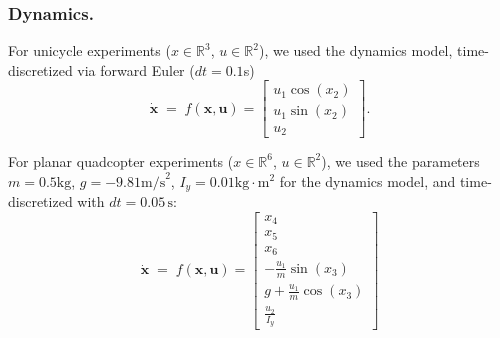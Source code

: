 \subsubsection{Dynamics. }\label{app:dynamics}
For unicycle experiments ($x \in \mathbb{R}^3$, $u \in \mathbb{R}^2$), we used the dynamics model, time-discretized via forward Euler ($dt =0.1$s)
\begin{equation}\label{eq:unicycle}
    \dot{\mathbf{x}}\;=\; f(\mathbf{x},\mathbf{u})=
    \begin{bmatrix}
        u_1 \cos(x_2) \\ u_1 \sin(x_2) \\ u_2
    \end{bmatrix}.
\end{equation}

\noindent For planar quadcopter experiments ($x \in \mathbb{R}^6$, $u \in \mathbb{R}^2$), we used the parameters $m=0.5\textrm{kg}$, $g=-9.81\textrm{m/s}^2$, $I_y=0.01\textrm{kg} \cdot \textrm{m}^2$ for the dynamics model, and time-discretized with $dt = 0.05\,\mathrm{s}$:%
\begin{equation}\label{eq:2dquad}
    \dot{\mathbf{x}}\;=\; f(\mathbf{x},\mathbf{u})=\begin{bmatrix}
        x_4 \\ x_5 \\ x_6 \\ -\frac{u_1}{m} \sin(x_3)\\ g+\frac{u_1}{m}\cos(x_3)\\\frac{u_2}{I_y}
    \end{bmatrix}
\end{equation}

